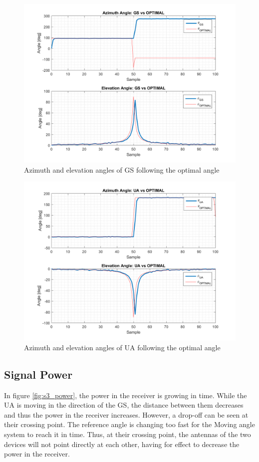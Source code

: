 \begin{figure}[H]
	\centering
	\includegraphics[scale=0.8]{figures/s3_gs.png}
	\caption{Azimuth and elevation angles of GS following the optimal angle}
	\label{fig:s3_gs}
\end{figure}

\begin{figure}[H]
	\centering
	\includegraphics[scale=0.8]{figures/s3_ua.png}
	\caption{Azimuth and elevation angles of UA following the optimal angle}
	\label{fig:s3_ua}
\end{figure}

\subsection*{Signal Power}
In figure \ref{fig:s3_power}, the power in the receiver is growing in time. While the UA is moving in the direction of the GS, the distance between them decreases and thus the power in the receiver increases. However, a drop-off can be seen at their crossing point. The reference angle is changing too fast for the Moving angle system to reach it in time. Thus, at their crossing point, the antennas of the two devices will not point directly at each other, having for effect to decrease the power in the receiver.

